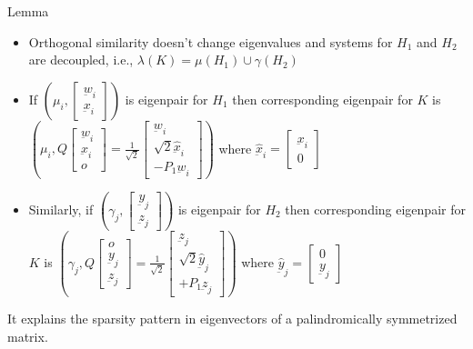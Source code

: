 Lemma
\begin{itemize}
    \item Orthogonal similarity doesn't change eigenvalues and systems for $H_1$ and $H_2$ are decoupled, i.e.,  $\lambda(K) = \mu(H_1) \cup \gamma(H_2)$
    \item If $(\mu_i,\begin{bmatrix}
    \underbar{w}_i \\
    \underbar{x}_i
    \end{bmatrix})$ is eigenpair for $H_1$ then corresponding eigenpair for $K$ is $(\mu_i,Q \begin{bmatrix}
    \underbar{w}_i \\
    \underbar{x}_i\\
    o 
    \end{bmatrix} = \frac{1}{\sqrt{2}}
    \begin{bmatrix}
        \underbar{w}_i \\
    \sqrt{2}\hat{\underbar{x}}_i \\
    -P_1\underbar{w}_i
    \end{bmatrix}
    )$ where $\hat{\underbar{x}}_i = \begin{bmatrix}
        \underbar{x}_i\\
        0
    \end{bmatrix}$
    \item Similarly, if $(\gamma_j,\begin{bmatrix}
    \underbar{y}_j \\
    \underbar{z}_j
    \end{bmatrix})$ is eigenpair for $H_2$ then corresponding eigenpair for $K$ is $(\gamma_j,Q \begin{bmatrix}
    o \\
    \underbar{y}_j \\
    \underbar{z}_j
    \end{bmatrix} = \frac{1}{\sqrt{2}}
    \begin{bmatrix}
        \underbar{z}_j \\
    \sqrt{2}\hat{\underbar{y}}_j \\
    +P_1\underbar{z}_j
    \end{bmatrix}
    ) 
    $ where $\hat{\underbar{y}}_j = \begin{bmatrix}
        0 \\
        \underbar{y}_j
        \end{bmatrix}$
\end{itemize}

It explains the sparsity pattern in eigenvectors of a palindromically symmetrized matrix.
\clearpage